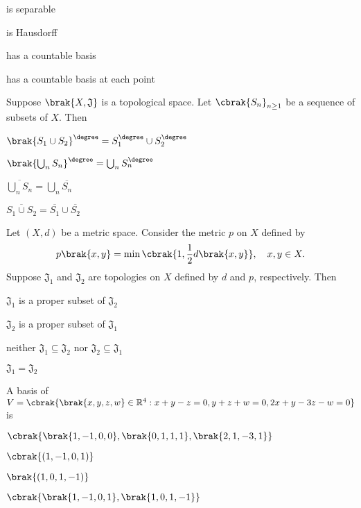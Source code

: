 \begin{enumerate}
\begin{multicols}{2}
\item is separable
\item is Hausdorff
\item has a countable basis
\item has a countable basis at each point
\end{multicols}
\end{enumerate}
\item Suppose $\brak{X, \mathfrak{J}}$ is a topological space. Let $\cbrak{S_n}_{n \geq 1}$ be a sequence of subsets of $X$. Then
\begin{enumerate}
\begin{multicols}{2}
\item $\brak{S_1 \cup S_2}^\degree = S_1^\degree \cup S_2^\degree$
\item $\brak{ \bigcup_{n} S_n }^\degree = \bigcup_{n} S_n^\degree$
\item $\overline{\bigcup_{n} S_n} = \bigcup_{n} \overline{S_n}$
\item $\overline{S_1 \cup S_2} = \overline{S_1} \cup \overline{S_2}$
\end{multicols}
\end{enumerate}
\item Let $(X, d)$ be a metric space. Consider the metric $p$ on $X$ defined by $$p\brak{x, y} = \min\cbrak{1, \frac{1}{2}d\brak{x, y}}, \quad x, y \in X.$$ Suppose $\mathfrak{J}_{1}$ and $\mathfrak{J}_{2}$ are topologies on $X$ defined by $d$ and $p$, respectively. Then
\begin{enumerate}
\begin{multicols}{2}
\item  $\mathfrak{J}_{1}$ is a proper subset of $\mathfrak{J}_{2}$  
\item  $\mathfrak{J}_{2}$ is a proper subset of $\mathfrak{J}_{1}$
\item neither $\mathfrak{J}_{1} \subseteq \mathfrak{J}_{2}$ nor $\mathfrak{J}_{2} \subseteq \mathfrak{J}_{1}$ 
\item $\mathfrak{J}_{1} = \mathfrak{J}_{2}$
\end{multicols}
\end{enumerate}
\item A basis of $V = \cbrak{\brak{x, y, z, w} \in \mathbb{R}^4: x+y-z=0, y+z+w=0, 2x+y-3z-w=0}$ is
\begin{enumerate}
\begin{multicols}{2}
\item $\cbrak{\brak{1, -1, 0, 0}, \brak{0, 1, 1, 1}, \brak{2, 1, -3, 1}}$
\item $\cbrak{(1, -1, 0, 1)}$
\item $\brak{(1, 0, 1, -1)}$ 
\item $\cbrak{\brak{1, -1, 0, 1}, \brak{1, 0, 1, -1}}$
\end{multicols}
\end{enumerate}
